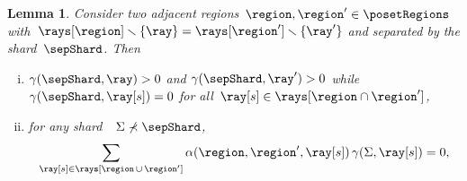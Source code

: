 \documentclass{amsart}
\newtheorem{lemma}[theorem]{Lemma}
\theoremstyle{definition}
\newcommand{\ssm}{\smallsetminus} %
\newcommand{\shard}{\Sigma}
\newcommand{\contribution}{\gamma} %
\newcommand{\coefficient}{\alpha} %
\begin{document}
\begin{lemma}
\label{lem:contribution}
Consider two adjacent regions~$\region, \region' \in \posetRegions$ with~${\rays[\region] \ssm \{\ray\} = \rays[\region'] \ssm \{\ray'\}}$ and separated by the shard~$\sepShard$.
Then
\begin{enumerate}[(i)]
\item $\contribution(\sepShard, \ray) > 0$ and  $\contribution(\sepShard, \ray') > 0$ while~$\contribution(\sepShard, \ray[s]) = 0$ for all~${\ray[s] \in \rays[\region \cap \region']}$,
\item for any shard~~$\shard \not\prec \sepShard$,
\[
\sum_{\ray[s] \in \rays[\region \,\cup\, \region']} \coefficient(\region, \region', \ray[s]) \, \contribution(\shard, \ray[s]) = 0,
\]
\end{enumerate}
\end{lemma}
\end{document}
